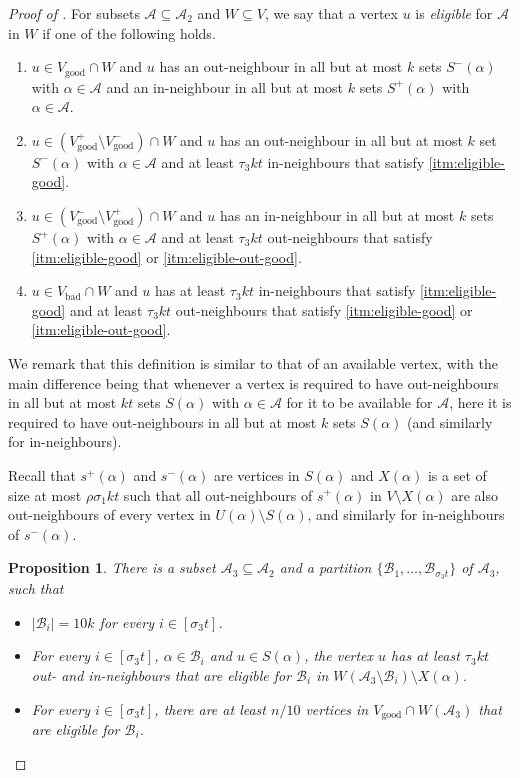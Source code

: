 \documentclass[english]{article}
\theoremstyle{plain}
\newtheorem{proposition}[theorem]{Proposition}
\theoremstyle{remark}
\def\B{\mathcal{B}}
\def \Sp {S^+}
\def \Sm {S^-}
\def \sp {s^+}
\def \smm {s^-}
\def \Vgp {V_{\good}^+}
\def \Vgp {V_{\good}^+}
\def \Vgm {V_{\good}^-}
\def \Vg {V_{\good}}
\def \Vb {V_{\bad}}
\def \Vgm {V_{\good}^-}
\newcommand{\sm}{\setminus}
\newcommand{\A}{\mathcal{A}}
\DeclareMathOperator{\bad}{bad}
\DeclareMathOperator{\good}{good}
\begin{document}
\begin{proof}[Proof of ]
		For subsets $\A \subseteq \A_2$ and $W \subseteq V$, we say that a vertex $u$ is \emph{eligible} for $\A$ in $W$ if one of the following holds. 
		\begin{enumerate}[label = \rm(E\arabic*)]
			\item \label{itm:eligible-good}
				$u \in \Vg \cap W$ and $u$ has an out-neighbour in all but at most $k$ sets $\Sm(\alpha)$ with $\alpha \in \A$ and an in-neighbour in all but at most $k$ sets $\Sp(\alpha)$ with $\alpha \in \A$.
			\item \label{itm:eligible-out-good}
				$u \in (\Vgp \setminus \Vgm) \cap W$ and $u$ has an out-neighbour in all but at most $k$ set $\Sm(\alpha)$ with $\alpha \in \A$ and at least $\tau_3 kt$ in-neighbours that satisfy \ref{itm:eligible-good}.
			\item \label{itm:eligible-in-good}
				$u \in (\Vgm \setminus \Vgp) \cap W$ and $u$ has an in-neighbour in all but at most $k$ sets $\Sp(\alpha)$ with $\alpha \in \A$ and at least $\tau_3 kt$ out-neighbours that satisfy \ref{itm:eligible-good} or \ref{itm:eligible-out-good}.
			\item \label{itm:eligible-bad}
				$u \in \Vb \cap W$ and $u$ has at least $\tau_3 kt$ in-neighbours that satisfy \ref{itm:eligible-good} and at least $\tau_3 kt$ out-neighbours that satisfy \ref{itm:eligible-good} or \ref{itm:eligible-out-good}.
		\end{enumerate}
		We remark that this definition is similar to that of an available vertex, with the main difference being that whenever a vertex is required to have out-neighbours in all but at most $kt$ sets $S(\alpha)$ with $\alpha \in \A$ for it to be available for $\A$, here it is required to have out-neighbours in all but at most $k$ sets $S(\alpha)$ (and similarly for in-neighbours). 

		Recall that $\sp(\alpha)$ and $\smm(\alpha)$ are vertices in $S(\alpha)$ and $X(\alpha)$ is a set of size at most $\rho\sigma_1 kt$ such that all out-neighbours of $\sp(\alpha)$ in $V \setminus X(\alpha)$ are also out-neighbours of every vertex in $U(\alpha) \setminus S(\alpha)$, and similarly for in-neighbours of $\smm(\alpha)$.

		\begin{proposition} \label{prop:eligible}
			There is a subset $\A_3 \subseteq \A_2$ and a partition $\{\B_1, \ldots, \B_{\sigma_3 t}\}$ of $\A_3$, such that 
			\begin{itemize}
				\item
					$|\B_i| = 10k$ for every $i \in [\sigma_3 t]$.
				\item
					 For every $i \in [\sigma_3 t]$, $\alpha \in \B_i$ and $u \in S(\alpha)$, the vertex $u$ has at least $\tau_3 kt$ out- and in-neighbours that are eligible for $\B_i$ in $W(\A_3 \setminus \B_i) \sm X(\alpha)$.
				\item
					For every $i \in [\sigma_3 t]$, there are at least $n/10$ vertices in $\Vg \cap W(\A_3)$ that are eligible for $\B_i$.
			\end{itemize}
		\end{proposition}


\end{proof}
\end{document}
